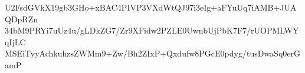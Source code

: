 U2FsdGVkX19gb3GHo+xBAC4PIVP3VXdWtQJ97i3eIg+aFYuUq7iAMB+JUAQDpRZn
34bM9PRYi7uUz4u/gLDkZG7/Zr9XFidw2PZLE0UwnbUjPbK7F7/rUOPMLWYqIjLC
MSEiTyyAchkuhzsZWMm9+Zw/Bh2ZIxP+Qxdufw8PGcE0pdyg/tusDwaSq0erGamP
